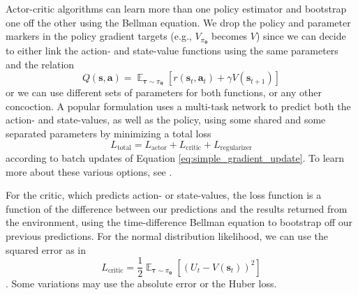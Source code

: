 \documentclass{article}
\begin{document}
Actor-critic algorithms can learn more than one policy estimator and bootstrap one off the other using the Bellman equation. We drop the policy and parameter markers in the policy gradient targets (e.g., $V_{\pi_{\boldsymbol{\theta}}}$ becomes $V$) since we can decide to either link the action- and state-value functions using the same parameters and the relation \begin{equation}Q(\mathbf{s},\mathbf{a})=\mathop{\mathbb{E}}_{\boldsymbol{\tau}\sim\pi_{\boldsymbol{\theta}}}\left[r(\mathbf{s}_t,\mathbf{a}_t)+\gamma V(\mathbf{s}_{t+1})\right]\end{equation}or we can use different sets of parameters for both functions, or any other concoction. A popular formulation uses a multi-task network to predict both the action- and state-values, as well as the policy, using some shared and some separated parameters\cite{shared_parameters_action_state} by minimizing a total loss \begin{equation}L_\text{total}=L_\text{actor}+L_\text{critic}+L_\text{regularizer}\end{equation} according to batch updates of Equation \ref{eq:simple_gradient_update}. To learn more about these various options, see \cite{online_policy_gradient_review,openAI_part3}.

For the critic, which predicts action- or state-values, the loss function is a function of the difference between our predictions and the results returned from the environment, using the time-difference Bellman equation to bootstrap off our previous predictions. For the normal distribution likelihood, we can use the squared error as in \begin{equation}L_\text{critic}=\frac{1}{2}\mathop{\mathbb{E}}_{\boldsymbol{\tau}\sim\pi_{\boldsymbol{\theta}}}\left[\left(U_t-V(\mathbf{s}_{t})\right)^2\right]\end{equation}. Some variations may use the absolute error or the Huber loss. 
\end{document}
